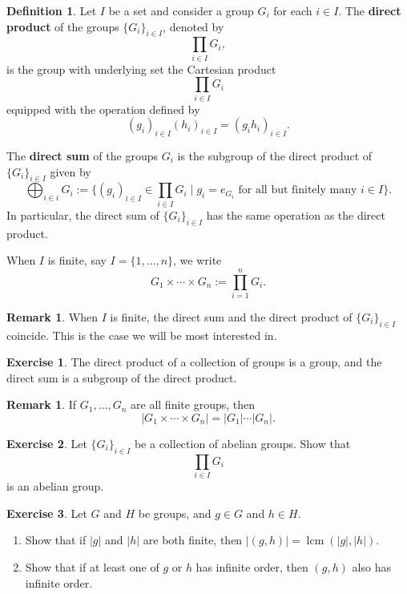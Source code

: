 \documentclass[12pt]{report}
\numberwithin{equation}{section}
\numberwithin{theorem}{chapter}
\theoremstyle{definition}
\newtheorem{definition}[theorem]{Definition}
\newtheorem{exercise}{Exercise}
\newtheorem*{basic properties}{Basic Properties}
\newtheorem*{Important Remark}{Important Remark}
\newtheorem{remark}[theorem]{Remark}
\DeclareMathOperator{\lcm}{lcm}
\begin{document}
\begin{definition}
Let $I$ be a set and consider a group $G_i$ for each $i \in I$.
The {\bf direct product} of the groups $\{ G_i \}_{i \in I}$, denoted by
$$\prod_{i \in I} G_i,$$
is the group with underlying set the Cartesian product 
$$\prod_{i \in I} G_i$$
equipped with the operation defined by
$$(g_i)_{i \in  I} (h_i)_{i \in I} = (g_i h_i)_{i \in I}.$$ 

The {\bf direct sum} of the groups $G_i$ is the subgroup of the direct product of  $\{ G_i \}_{i \in I}$ given by
$$\bigoplus_{i \in i} G_i := \{(g_i)_{i \in I} \in \prod_{i \in I} G_i \mid  g_i = e_{G_i} \text{ for all but finitely many } i \in I \}.$$ 
In particular, the direct sum of $\{ G_i \}_{i \in I}$ has the same operation as the direct product. 

When $I$ is finite, say $I = \{ 1, \ldots, n \}$, we write
$$G_1 \times \cdots \times G_n := \prod_{i = 1}^n G_i.$$
\end{definition}


\begin{remark}
	When $I$ is finite, the direct sum and the direct product of $\{ G_i \}_{i \in I}$ coincide. This is the case we will be most interested in.
\end{remark}


\begin{exercise}\label{direct product group}
	The direct product of a collection of groups is a group, and the direct sum is a subgroup of the direct product.
\end{exercise}


\begin{remark}
	If $G_1, \ldots, G_n$ are all finite groups, then
	$$|G_1 \times \cdots \times G_n| = |G_1| \cdots |G_n|.$$
\end{remark}


\begin{exercise}
	Let $\{ G_i \}_{i \in I}$ be a collection of abelian groups. Show that
	$$\prod_{i \in I} G_i$$
	is an abelian group.
\end{exercise}


\begin{exercise}\label{order of pairs}
	Let $G$ and $H$ be groups, and $g \in G$ and $h \in H$.

\vspace{-0.3em}
\begin{enumerate}[label=(\alph*), itemsep=0.2em]

\item Show that if $|g|$ and $|h|$ are both finite, then $|(g,h)| = \lcm(|g|,|h|)$.

\item Show that if at least one of $g$ or $h$ has infinite order, then $(g,h)$ also has infinite order.

\end{enumerate}
\end{exercise}
\end{document}
